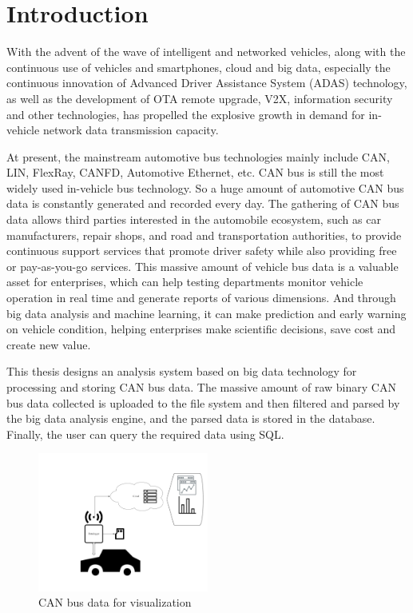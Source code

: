 \chapter{Introduction}
\label{ch:introduction}

With the advent of the wave of intelligent and networked vehicles, along with the continuous use of vehicles and smartphones, cloud and big data, especially the continuous innovation of Advanced Driver Assistance System (ADAS) technology, as well as the development of OTA remote upgrade, V2X, information security and other technologies, has propelled the explosive growth in demand for in-vehicle network data transmission capacity\cite{connected_and_Intelligent_Vehicles}.

At present, the mainstream automotive bus technologies mainly include CAN, LIN, FlexRay, CANFD, Automotive Ethernet, etc. CAN bus is still the most widely used in-vehicle bus technology. So a huge amount of automotive CAN bus data is constantly generated and recorded every day. The gathering of CAN bus data allows third parties interested in the automobile ecosystem, such as car manufacturers, repair shops, and road and transportation authorities, to provide continuous support services that promote driver safety while also providing free or pay-as-you-go services\cite{7993938}. This massive amount of vehicle bus data is a valuable asset for enterprises, which can help testing departments monitor vehicle operation in real time and generate reports of various dimensions. And through big data analysis and machine learning, it can make prediction and early warning on vehicle condition, helping enterprises make scientific decisions, save cost and create new value. 

This thesis designs an analysis system based on big data technology for processing and storing CAN bus data. The massive amount of raw binary CAN bus data collected is uploaded to the file system and then filtered and parsed by the big data analysis engine, and the parsed data is stored in the database. Finally, the user can query the required data using SQL. 

\begin{figure}[hbt!]
    \centering
    \includegraphics[width=0.5\textwidth]{gfx/zd_datalogger_cloud.png}
    \caption{CAN bus data for visualization}
    \label{fig:galaxy}
\end{figure}

